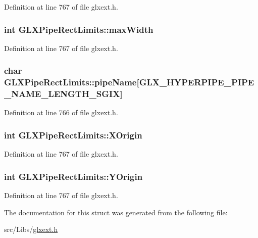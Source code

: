 Definition at line 767 of file glxext.h.

\hypertarget{struct_g_l_x_pipe_rect_limits_a8662c7a712b30620e25fc994adf337a1}{
\subsubsection[{maxWidth}]{\setlength{\rightskip}{0pt plus 5cm}int {\bf GLXPipeRectLimits::maxWidth}}}
\label{struct_g_l_x_pipe_rect_limits_a8662c7a712b30620e25fc994adf337a1}


Definition at line 767 of file glxext.h.

\hypertarget{struct_g_l_x_pipe_rect_limits_ae78b4b6656101bc841946733a5b6e5ce}{
\subsubsection[{pipeName}]{\setlength{\rightskip}{0pt plus 5cm}char {\bf GLXPipeRectLimits::pipeName}\mbox{[}GLX\_\-HYPERPIPE\_\-PIPE\_\-NAME\_\-LENGTH\_\-SGIX\mbox{]}}}
\label{struct_g_l_x_pipe_rect_limits_ae78b4b6656101bc841946733a5b6e5ce}


Definition at line 766 of file glxext.h.

\hypertarget{struct_g_l_x_pipe_rect_limits_a3e5a965059d9f5d2ca42acd35af5bb9b}{
\subsubsection[{XOrigin}]{\setlength{\rightskip}{0pt plus 5cm}int {\bf GLXPipeRectLimits::XOrigin}}}
\label{struct_g_l_x_pipe_rect_limits_a3e5a965059d9f5d2ca42acd35af5bb9b}


Definition at line 767 of file glxext.h.

\hypertarget{struct_g_l_x_pipe_rect_limits_a50e06bcf0dae95854be7d93a515199e9}{
\subsubsection[{YOrigin}]{\setlength{\rightskip}{0pt plus 5cm}int {\bf GLXPipeRectLimits::YOrigin}}}
\label{struct_g_l_x_pipe_rect_limits_a50e06bcf0dae95854be7d93a515199e9}


Definition at line 767 of file glxext.h.



The documentation for this struct was generated from the following file:\begin{DoxyCompactItemize}
\item 
src/Libs/\hyperlink{glxext_8h}{glxext.h}\end{DoxyCompactItemize}
